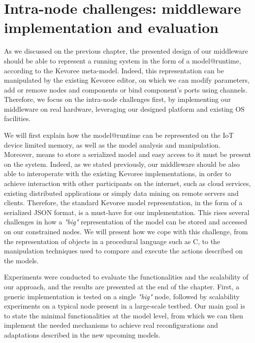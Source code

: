 \chapter{Intra-node challenges: middleware implementation and evaluation}
As we discussed on the previous chapter, the presented design of our middleware should be able to represent a running system in the form of a model@runtime, according to the Kevoree meta-model.
Indeed, this representation can be manipulated by the existing Kevoree editor, on which we can modify parameters, add or remove nodes and components or bind component's ports using channels.
Therefore, we focus on the intra-node challenges first, by implementing our middleware on real hardware, leveraging our designed platform and existing OS facilities.

We will first explain how the model@runtime can be represented on the IoT device limited memory, as well as the model analysis and manipulation.
Moreover, means to store a serialized model and easy access to it must be present on the system.
Indeed, as we stated previously, our middleware should be also able to interoperate with the existing Kevoree implementations, in order to achieve interaction with other participants on the internet, such as cloud services, existing distributed applications or simply data mining on remote servers and clients.
Therefore, the standard Kevoree model representation, in the form of a serialized JSON format, is a must-have for our implementation.
This rises several challenges in how a \textit{"big"} representation of the model can be stored and accessed on our constrained nodes.
We will present how we cope with this challenge, from the representation of objects in a procedural language such as C, to the manipulation techniques used to compare and execute the actions described on the models.

Experiments were conducted to evaluate the functionalities and the scalability of our approach, and the results are presented at the end of the chapter.
First, a generic implementation is tested on a single \textit{"big"} node, followed by scalability experiments on a typical node present in a large-scale testbed.
Our main goal is to state the minimal functionalities at the model level, from which we can then implement the needed mechanisms to achieve real reconfigurations and adaptations described in the new upcoming models.





